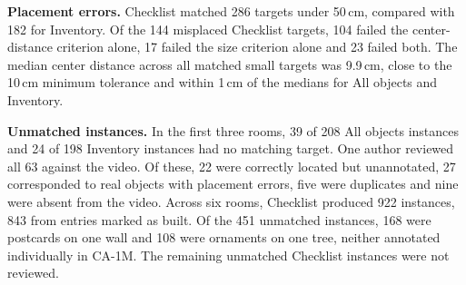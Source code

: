 \textbf{Placement errors.}
Checklist matched 286 targets under 50\,cm, compared with 182 for Inventory.
Of the 144 misplaced Checklist targets, 104 failed the center-distance
criterion alone, 17 failed the size criterion alone and 23 failed both.
The median center distance across all matched small targets was 9.9\,cm,
close to the 10\,cm minimum tolerance and within 1\,cm of the medians for
All objects and Inventory.

\textbf{Unmatched instances.}
In the first three rooms, 39 of 208 All objects instances and 24 of 198
Inventory instances had no matching target. One author reviewed all 63
against the video. Of these, 22 were correctly located but unannotated,
27 corresponded to real objects with placement errors, five were duplicates
and nine were absent from the video. Across six rooms, Checklist produced
922 instances, 843 from entries marked as built. Of the 451 unmatched
instances, 168 were postcards on one wall and 108 were ornaments on one
tree, neither annotated individually in CA-1M. The remaining unmatched
Checklist instances were not reviewed.
